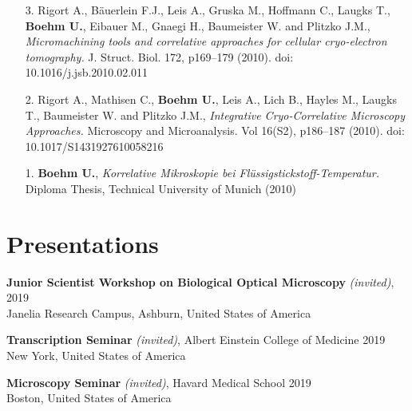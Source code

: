 \documentclass[margin,line]{res}
\begin{document}
\begin{resume}
\begin{enumerate}[leftmargin=*]
\item[3.] Rigort A., Bäuerlein F.J., Leis A., Gruska M., Hoffmann C., Laugks T., {\bf Boehm U.}, Eibauer M., Gnaegi H., Baumeister W. and Plitzko J.M.,  {\it Micromachining tools and correlative approaches for cellular cryo-electron tomography.} J. Struct. Biol. 172, p169–179 (2010). doi: 10.1016/j.jsb.2010.02.011

\item[2.] Rigort A., Mathisen C., {\bf Boehm U.}, Leis A., Lich B., Hayles M., Laugks T., Baumeister W. and Plitzko J.M.,  {\it Integrative Cryo-Correlative Microscopy Approaches.}
Microscopy and Microanalysis. Vol 16(S2), p186–187 (2010). doi: 10.1017/S1431927610058216 

\item[1.]{\bf Boehm U.},  {\it Korrelative Mikroskopie bei Flüssigstickstoff-Temperatur.} Diploma Thesis, Technical University of Munich (2010)     

\end{enumerate}


\section{\sc  Presentations}

{\bf  Junior Scientist Workshop on Biological Optical Microscopy} {\it (invited)},  \hfill 2019\\
Janelia Research Campus, Ashburn, United States of America %

\vspace*{-2.5mm}
{\bf  Transcription Seminar} {\it (invited)}, Albert Einstein College of Medicine \hfill 2019\\
 New York, United States of America%

\vspace*{-2.5mm}
{\bf  Microscopy Seminar} {\it (invited)}, Havard Medical School \hfill 2019\\
 Boston, United States of America%


\end{resume}
\end{document}
